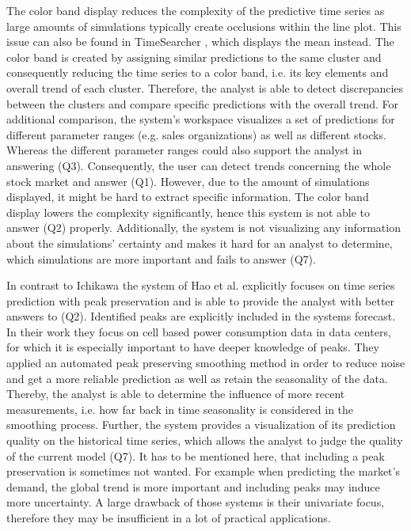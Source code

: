 \documentclass[electronic]{vgtc}             %
\begin{document}
The color band display reduces the complexity of the predictive time series as large amounts of simulations typically create occlusions within the line plot.
This issue can also be found in TimeSearcher \cite{buono:2007}, which displays the mean instead.
The color band is created by assigning similar predictions to the same cluster and consequently reducing the time series to a color band, i.e. its key elements and overall trend of each cluster.
Therefore, the analyst is able to detect discrepancies between the clusters and compare specific predictions with the overall trend. 
For additional comparison, the system's workspace visualizes a set of predictions for different parameter ranges (e.g. sales organizations) as well as different stocks.
Whereas the different parameter ranges could also support the analyst in answering (Q3).
Consequently, the user can detect trends concerning the whole stock market and answer (Q1).  
However, due to the amount of simulations displayed, it might be hard to extract specific information.
The color band display lowers the complexity significantly, hence this system is not able to answer (Q2) properly.
Additionally, the system is not visualizing any information about the simulations' certainty and makes it hard for an analyst to determine, which simulations are more important and fails to answer (Q7).

In contrast to Ichikawa \cite{ichikawa:2002} the system of Hao et al. \cite{Hao:2011, Hao:2009} explicitly focuses on time series prediction with peak preservation and is able to provide the analyst with better answers to (Q2).
Identified peaks are explicitly included in the systems forecast.
In their work they focus on cell based power consumption data in data centers, for which it is especially important to have deeper knowledge of peaks.
They applied an automated peak preserving smoothing method in order to reduce noise and get a more reliable prediction as well as retain the seasonality of the data.
Thereby, the analyst is able to determine the influence of more recent measurements, i.e. how far back in time seasonality is considered in the smoothing process. 
Further, the system provides a visualization of its prediction quality on the historical time series, which allows the analyst to judge the quality of the current model (Q7). 
It has to be mentioned here, that including a peak preservation is sometimes not wanted.
For example when predicting the market's demand, the global trend is more important and including peaks may induce more uncertainty. 
A large drawback of those systems is their univariate focus, therefore they may be insufficient in a lot of practical applications.
\end{document}
